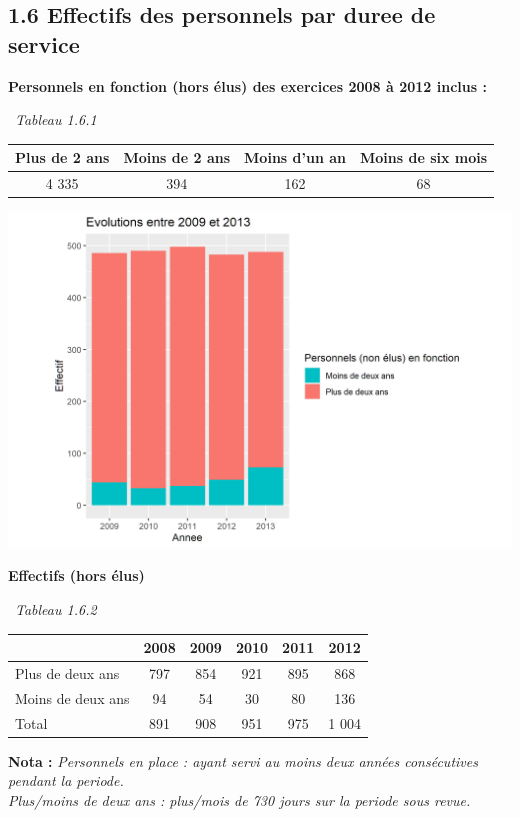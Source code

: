 \hypertarget{effectifs-des-personnels-par-duree-de-service}{%
\subsection{1.6 Effectifs des personnels par duree de
service}\label{effectifs-des-personnels-par-duree-de-service}}

\textbf{Personnels en fonction (hors élus) des exercices 2008 à 2012
inclus :}

~\emph{Tableau 1.6.1}

\begin{longtable}[]{@{}cccc@{}}
\toprule
Plus de 2 ans & Moins de 2 ans & Moins d'un an & Moins de six
mois\tabularnewline
\midrule
\endhead
4 335 & 394 & 162 & 68\tabularnewline
\bottomrule
\end{longtable}

\includegraphics{altair_files/figure-latex/unnamed-chunk-35-1.png}

\textbf{Effectifs (hors élus)}

~\emph{Tableau 1.6.2}

\begin{longtable}[]{@{}lccccc@{}}
\toprule
& 2008 & 2009 & 2010 & 2011 & 2012\tabularnewline
\midrule
\endhead
Plus de deux ans & 797 & 854 & 921 & 895 & 868\tabularnewline
Moins de deux ans & 94 & 54 & 30 & 80 & 136\tabularnewline
Total & 891 & 908 & 951 & 975 & 1 004\tabularnewline
\bottomrule
\end{longtable}

\textbf{Nota :} \emph{Personnels en place : ayant servi au moins deux
années consécutives pendant la periode.}\\
\emph{Plus/moins de deux ans : plus/mois de 730 jours sur la periode
sous revue.}

